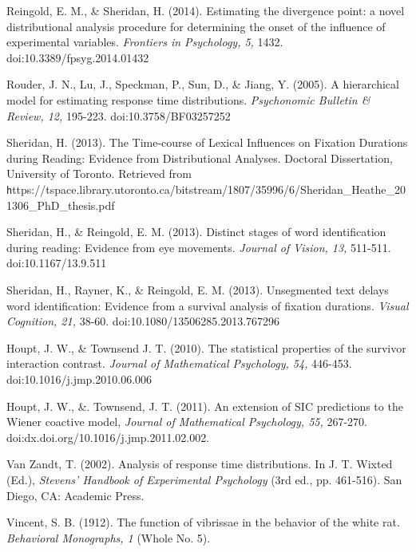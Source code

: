\documentclass[man]{apa}%
\begin{document}
Reingold, E. M., \& Sheridan, H. (2014). Estimating the divergence point: a novel distributional analysis procedure for determining the onset of the influence of experimental variables. \emph{Frontiers in Psychology, 5,} 1432. doi:10.3389/fpsyg.2014.01432

Rouder, J. N., Lu, J., Speckman, P., Sun, D., \& Jiang, Y. (2005). A hierarchical model for estimating response time distributions. \emph{Psychonomic Bulletin \& Review, 12,} 195-223. doi:10.3758/BF03257252

Sheridan, H. (2013). The Time-course of Lexical Influences on Fixation Durations during Reading: Evidence from Distributional Analyses. Doctoral Dissertation, University of Toronto. Retrieved from {\texttt https://tspace.library.utoronto.ca/bitstream/1807/35996/6/Sheridan\_Heathe\_201306\_PhD\_thesis.pdf}

Sheridan, H., \& Reingold, E. M. (2013). Distinct stages of word identification during reading: Evidence from eye movements. \emph{Journal of Vision, 13,} 511-511. doi:10.1167/13.9.511

Sheridan, H., Rayner, K., \& Reingold, E. M. (2013). Unsegmented text delays word identification: Evidence from a survival analysis of fixation durations. \emph{Visual Cognition, 21,} 38-60. doi:10.1080/13506285.2013.767296

Houpt, J. W., \& Townsend J. T. (2010). The statistical properties of the survivor interaction contrast. \emph{Journal of Mathematical Psychology, 54,} 446-453. doi:10.1016/j.jmp.2010.06.006

Houpt, J. W., \&. Townsend, J. T. (2011). An extension of SIC predictions to the Wiener coactive model, \emph{Journal of Mathematical Psychology, 55,}  267-270. doi:dx.doi.org/10.1016/j.jmp.2011.02.002.


Van Zandt, T. (2002). Analysis of response time distributions. In J. T. Wixted (Ed.), \emph{Stevens' Handbook of Experimental Psychology} (3rd ed., pp. 461-516). San Diego, CA: Academic Press. 


Vincent, S. B. (1912). The function of vibrissae in the behavior of the white rat. \emph{Behavioral Monographs, 1} (Whole No. 5).



\end{document}
